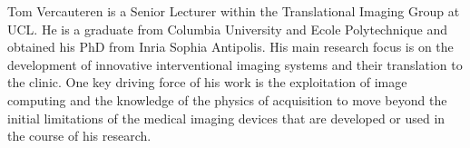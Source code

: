 \documentclass[10pt,journal,compsoc]{IEEEtran}
\begin{document}
\begin{IEEEbiography}{Tom Vercauteren}
is a Senior Lecturer within the Translational Imaging Group at UCL. %
He is a graduate from Columbia University and Ecole Polytechnique and obtained his PhD from Inria Sophia Antipolis. His main research focus is on the development of innovative interventional imaging systems and their translation to the clinic. One key driving force of his work is the exploitation of image computing and the knowledge of the physics of acquisition to move beyond the initial limitations of the medical imaging devices that are developed or used in the course of his research. 
\end{IEEEbiography}







\end{document}
